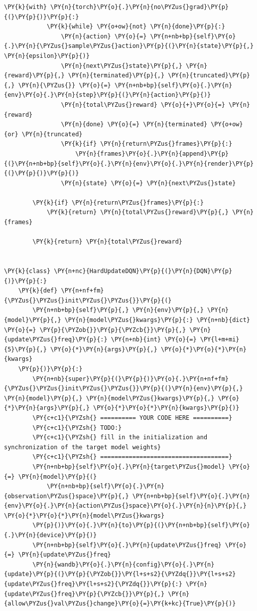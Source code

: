 \documentclass{article}
\begin{document}
\begin{Verbatim}[commandchars=\\\{\}]
        \PY{k}{with} \PY{n}{torch}\PY{o}{.}\PY{n}{no\PYZus{}grad}\PY{p}{(}\PY{p}{)}\PY{p}{:}
            \PY{k}{while} \PY{o+ow}{not} \PY{n}{done}\PY{p}{:}
                \PY{n}{action} \PY{o}{=} \PY{n+nb+bp}{self}\PY{o}{.}\PY{n}{\PYZus{}sample\PYZus{}action}\PY{p}{(}\PY{n}{state}\PY{p}{,} \PY{n}{epsilon}\PY{p}{)}
                \PY{n}{next\PYZus{}state}\PY{p}{,} \PY{n}{reward}\PY{p}{,} \PY{n}{terminated}\PY{p}{,} \PY{n}{truncated}\PY{p}{,} \PY{n}{\PYZus{}} \PY{o}{=} \PY{n+nb+bp}{self}\PY{o}{.}\PY{n}{env}\PY{o}{.}\PY{n}{step}\PY{p}{(}\PY{n}{action}\PY{p}{)}
                \PY{n}{total\PYZus{}reward} \PY{o}{+}\PY{o}{=} \PY{n}{reward}
                \PY{n}{done} \PY{o}{=} \PY{n}{terminated} \PY{o+ow}{or} \PY{n}{truncated}
                \PY{k}{if} \PY{n}{return\PYZus{}frames}\PY{p}{:}
                    \PY{n}{frames}\PY{o}{.}\PY{n}{append}\PY{p}{(}\PY{n+nb+bp}{self}\PY{o}{.}\PY{n}{env}\PY{o}{.}\PY{n}{render}\PY{p}{(}\PY{p}{)}\PY{p}{)}
                \PY{n}{state} \PY{o}{=} \PY{n}{next\PYZus{}state}

        \PY{k}{if} \PY{n}{return\PYZus{}frames}\PY{p}{:}
            \PY{k}{return} \PY{n}{total\PYZus{}reward}\PY{p}{,} \PY{n}{frames}

        \PY{k}{return} \PY{n}{total\PYZus{}reward}


\PY{k}{class} \PY{n+nc}{HardUpdateDQN}\PY{p}{(}\PY{n}{DQN}\PY{p}{)}\PY{p}{:}
    \PY{k}{def} \PY{n+nf+fm}{\PYZus{}\PYZus{}init\PYZus{}\PYZus{}}\PY{p}{(}
        \PY{n+nb+bp}{self}\PY{p}{,} \PY{n}{env}\PY{p}{,} \PY{n}{model}\PY{p}{,} \PY{n}{model\PYZus{}kwargs}\PY{p}{:} \PY{n+nb}{dict} \PY{o}{=} \PY{p}{\PYZob{}}\PY{p}{\PYZcb{}}\PY{p}{,} \PY{n}{update\PYZus{}freq}\PY{p}{:} \PY{n+nb}{int} \PY{o}{=} \PY{l+m+mi}{5}\PY{p}{,} \PY{o}{*}\PY{n}{args}\PY{p}{,} \PY{o}{*}\PY{o}{*}\PY{n}{kwargs}
    \PY{p}{)}\PY{p}{:}
        \PY{n+nb}{super}\PY{p}{(}\PY{p}{)}\PY{o}{.}\PY{n+nf+fm}{\PYZus{}\PYZus{}init\PYZus{}\PYZus{}}\PY{p}{(}\PY{n}{env}\PY{p}{,} \PY{n}{model}\PY{p}{,} \PY{n}{model\PYZus{}kwargs}\PY{p}{,} \PY{o}{*}\PY{n}{args}\PY{p}{,} \PY{o}{*}\PY{o}{*}\PY{n}{kwargs}\PY{p}{)}
        \PY{c+c1}{\PYZsh{} ========== YOUR CODE HERE ==========}
        \PY{c+c1}{\PYZsh{} TODO:}
        \PY{c+c1}{\PYZsh{} fill in the initialization and synchronization of the target model weights}
        \PY{c+c1}{\PYZsh{} ====================================}
        \PY{n+nb+bp}{self}\PY{o}{.}\PY{n}{target\PYZus{}model} \PY{o}{=} \PY{n}{model}\PY{p}{(}
            \PY{n+nb+bp}{self}\PY{o}{.}\PY{n}{observation\PYZus{}space}\PY{p}{,} \PY{n+nb+bp}{self}\PY{o}{.}\PY{n}{env}\PY{o}{.}\PY{n}{action\PYZus{}space}\PY{o}{.}\PY{n}{n}\PY{p}{,} \PY{o}{*}\PY{o}{*}\PY{n}{model\PYZus{}kwargs}
        \PY{p}{)}\PY{o}{.}\PY{n}{to}\PY{p}{(}\PY{n+nb+bp}{self}\PY{o}{.}\PY{n}{device}\PY{p}{)}
        \PY{n+nb+bp}{self}\PY{o}{.}\PY{n}{update\PYZus{}freq} \PY{o}{=} \PY{n}{update\PYZus{}freq}
        \PY{n}{wandb}\PY{o}{.}\PY{n}{config}\PY{o}{.}\PY{n}{update}\PY{p}{(}\PY{p}{\PYZob{}}\PY{l+s+s2}{\PYZdq{}}\PY{l+s+s2}{update\PYZus{}freq}\PY{l+s+s2}{\PYZdq{}}\PY{p}{:} \PY{n}{update\PYZus{}freq}\PY{p}{\PYZcb{}}\PY{p}{,} \PY{n}{allow\PYZus{}val\PYZus{}change}\PY{o}{=}\PY{k+kc}{True}\PY{p}{)}


\end{Verbatim}
\end{document}
